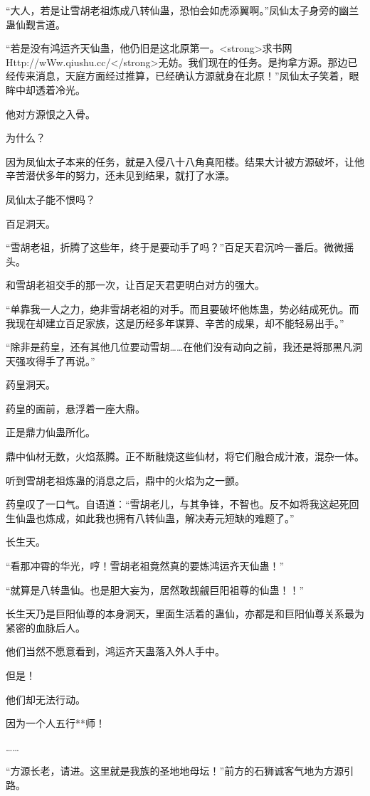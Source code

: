 \begin{this_body}
“大人，若是让雪胡老祖炼成八转仙蛊，恐怕会如虎添翼啊。”凤仙太子身旁的幽兰蛊仙觐言道。

“若是没有鸿运齐天仙蛊，他仍旧是这北原第一。<strong>求书网Http://wWw.qiushu.cc/</strong>无妨。我们现在的任务。是拘拿方源。那边已经传来消息，天庭方面经过推算，已经确认方源就身在北原！”凤仙太子笑着，眼眸中却透着冷光。

他对方源恨之入骨。

为什么？

因为凤仙太子本来的任务，就是入侵八十八角真阳楼。结果大计被方源破坏，让他辛苦潜伏多年的努力，还未见到结果，就打了水漂。

凤仙太子能不恨吗？

百足洞天。

“雪胡老祖，折腾了这些年，终于是要动手了吗？”百足天君沉吟一番后。微微摇头。

和雪胡老祖交手的那一次，让百足天君更明白对方的强大。

“单靠我一人之力，绝非雪胡老祖的对手。而且要破坏他炼蛊，势必结成死仇。而我现在却建立百足家族，这是历经多年谋算、辛苦的成果，却不能轻易出手。”

“除非是药皇，还有其他几位要动雪胡……在他们没有动向之前，我还是将那黑凡洞天强攻得手了再说。”

药皇洞天。

药皇的面前，悬浮着一座大鼎。

正是鼎力仙蛊所化。

鼎中仙材无数，火焰蒸腾。正不断融烧这些仙材，将它们融合成汁液，混杂一体。

听到雪胡老祖炼蛊的消息之后，鼎中的火焰为之一颤。

药皇叹了一口气。自语道：“雪胡老儿，与其争锋，不智也。反不如将我这起死回生仙蛊也炼成，如此我也拥有八转仙蛊，解决寿元短缺的难题了。”

长生天。

“看那冲霄的华光，哼！雪胡老祖竟然真的要炼鸿运齐天仙蛊！”

“就算是八转蛊仙。也是胆大妄为，居然敢觊觎巨阳祖尊的仙蛊！！”

长生天乃是巨阳仙尊的本身洞天，里面生活着的蛊仙，亦都是和巨阳仙尊关系最为紧密的血脉后人。

他们当然不愿意看到，鸿运齐天蛊落入外人手中。

但是！

他们却无法行动。

因为一个人五行**师！

……

“方源长老，请进。这里就是我族的圣地地母坛！”前方的石狮诚客气地为方源引路。


\end{this_body}

